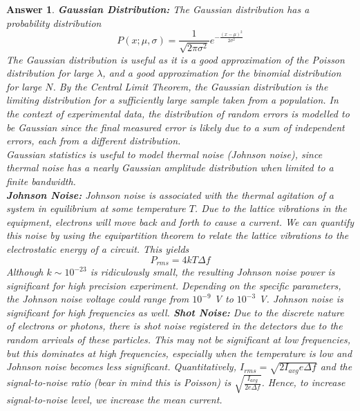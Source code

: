 \documentclass[a4paper]{article}
\newtheorem{ans}{Answer}[section]
\theoremstyle{new}
\begin{document}
\begin{ans}
\textbf{Gaussian Distribution:} The Gaussian distribution has a probability distribution
$$P(x;\mu,\sigma)=\frac{1}{\sqrt{2\pi\sigma^2}}e^{-\frac{(x-\mu)^2}{2\sigma^2}}$$
The Gaussian distribution is useful as it is a good approximation of the Poisson distribution for large $\lambda$, and a good approximation for the binomial distribution for large $N$. By the Central Limit Theorem, the Gaussian distribution is the limiting distribution for a sufficiently large sample taken from a population. In the context of experimental data, the distribution of random errors is modelled to be Gaussian since the final measured error is likely due to a sum of independent errors, each from a different distribution.\\[5pt]
Gaussian statistics is useful to model thermal noise (Johnson noise), since thermal noise has a nearly Gaussian amplitude distribution when limited to a finite bandwidth.\\[5pt]
\textbf{Johnson Noise:} Johnson noise is associated with the thermal agitation of a system in equilibrium at some temperature $T$. Due to the lattice vibrations in the equipment, electrons will move back and forth to cause a current. We can quantify this noise by using the equipartition theorem to relate the lattice vibrations to the electrostatic energy of a circuit. This yields
$$P_{rms}=4kT\Delta f $$
Although $k\sim 10^{-23}$ is ridiculously small, the resulting Johnson noise power is significant for high precision experiment. Depending on the specific parameters, the Johnson noise voltage could range from $10^{-9}$ V to $10^{-3}$ V. Johnson noise is significant for high frequencies as well.
\newpage
\textbf{Shot Noise:} Due to the discrete nature of electrons or photons, there is shot noise registered in the detectors due to the random arrivals of these particles. This may not be significant at low frequencies, but this dominates at high frequencies, especially when the temperature is low and Johnson noise becomes less significant. Quantitatively, $I_{rms}=\sqrt{2I_{avg}e\Delta f}$ and the signal-to-noise ratio (bear in mind this is Poisson) is $\sqrt{\frac{I_{avg}}{2e\Delta f}}$. Hence, to increase signal-to-noise level, we increase the mean current.
\end{ans}
\end{document}
